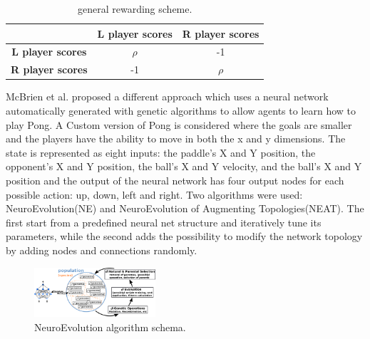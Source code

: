 \begin{table}[ht]
  \renewcommand{\arraystretch}{1.3}
  \caption{general rewarding scheme.}
  \label{tab:reward-scheme-2}
  \centering
  \begin{tabular}{c|c|c|}
    \cline{2-3}
                                                   & \textbf{L player scores} & \textbf{R player scores} \\ \hline
    \multicolumn{1}{|c|}{\textbf{L player scores}} & $\rho$                   & -1                       \\ \hline
    \multicolumn{1}{|c|}{\textbf{R player scores}} & -1                       & $\rho$                   \\ \hline
  \end{tabular}
\end{table}

McBrien et al. \cite{mcbrien2020learning} proposed a different approach which uses a neural network automatically generated with genetic algorithms to allow agents to learn how to play Pong.
%
A Custom version of Pong is considered where the goals are smaller and the players have the ability to move in both the x and y dimensions.
%
The state is represented as eight inputs: the paddle's X and Y position, the opponent's X and Y position, the ball's X and Y velocity,
and the ball's X and Y position and the output of the neural network has four output nodes for each possible action: up, down, left and right.
%
Two algorithms were used: NeuroEvolution(NE) and NeuroEvolution of Augmenting Topologies(NEAT).
The first start from a predefined neural net structure and iteratively tune its parameters, while the second adds the possibility to modify the network topology by adding nodes and connections randomly.

\begin{figure}[ht]
  \centering
  \includegraphics[width=0.4\textwidth]{images/neuroevolution.png}
  \caption{NeuroEvolution algorithm schema.}
  \label{fig:ne}
\end{figure}
